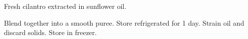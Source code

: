 \documentclass[main]{subfiles}
\begin{document}
Fresh cilantro extracted in sunflower oil.

\begin{rec}
Blend together into a smooth puree.
Store refrigerated for 1 day.
\newstep
Strain oil and discard solids. Store in freezer.
\end{rec}
\end{document}
